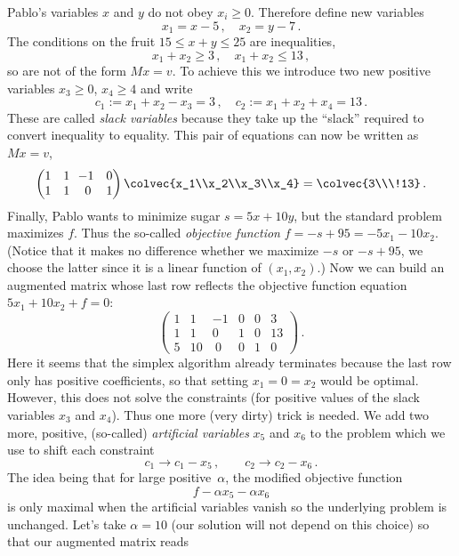 \begin{example}
Pablo's variables $x$ and $y$ do not obey $x_i\geq 0$. Therefore define new variables 
\[
x_1=x-5\, , \quad x_2=y-7\, .
\]
The conditions on the fruit $15\leq x+y\leq 25$ are inequalities, 
\[
x_1+x_2\geq 3\, ,\quad x_1+x_2\leq 13\, ,
\] 
so are not of the form $Mx = v$. To achieve this we introduce two new positive variables $x_3\geq0$, $x_4\geq 4$ and write
\[
c_1:=x_1+x_2-x_3=3\, ,\quad c_2:=x_1 + x_2 + x_4=13\, .
\]
These are called {\itshape slack variables} because they take up the ``slack'' required to convert inequality to equality.
This pair of equations can now be written as $Mx=v$,
\[
\begin{pmatrix}
1 &1&\!\!-1&0\\
1&1&0&1
\end{pmatrix}
\colvec{x_1\\x_2\\x_3\\x_4}=
\colvec{3\\\!13}\, .
\]
Finally, Pablo wants to minimize sugar $s=5x+10y$, but the standard problem maximizes $f$. Thus the so-called {\itshape objective function}
$f=-s+95=-5x_1-10x_2$. (Notice that it makes no difference whether we maximize $-s$ or $-s+95$, we choose the latter since it is
a linear function of $(x_1,x_2)$.)
Now we can build an augmented matrix whose last row reflects  the objective function equation $5 x_1+10 x_2 +f=0$:
\[
\left(\begin{array}{rrrrr|r}
1&1&-1&0&0&3\\
1&1&0&1&0&13\\\hline
5&10&\ 0&0&1&0
\end{array}\right)\, .
\]
Here it seems that the simplex algorithm already terminates because the last row only has positive coefficients, so that setting $x_1=0=x_2$
would be optimal. However, this does not solve the constraints (for positive values of the slack variables $x_3$ and $x_4$).
Thus one more (very dirty) trick is needed. We add two more, positive, (so-called) {\itshape artificial variables} $x_5$ and $x_6$ to the problem
which we use to shift each constraint 
\[
c_1\to c_1-x_5\, ,\qquad c_2\to c_2-x_6\, .
\]
The idea being that for large positive~$\alpha$,  the modified objective function \[f-\alpha x_5 - \alpha x_6\]
is only maximal when the artificial variables vanish so the underlying problem is unchanged. 
Let's take $\alpha=10$ (our solution will not depend on this choice) so that our augmented matrix reads 
\begin{align*}&

\end{align*}
\end{example}
